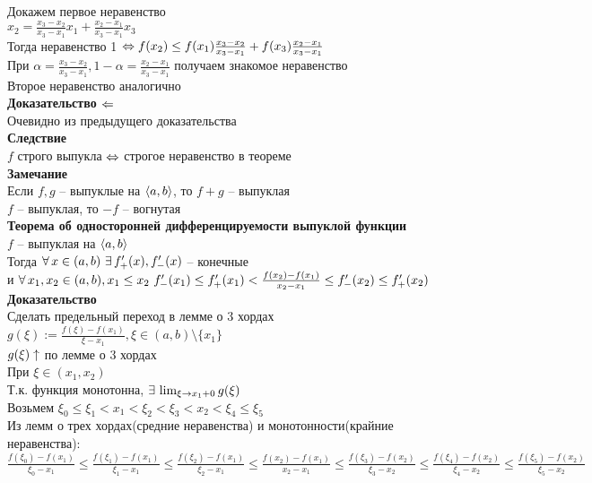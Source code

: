 \documentclass[12pt]{article}
\begin{document}
Докажем первое неравенство\\
$x_2 = \frac{x_3-x_2}{x_3-x_1}x_1 + \frac{x_2-x_1}{x_3-x_1}x_3$\\
Тогда неравенство 1 $\Leftrightarrow f(x_2) \leq f(x_1) \frac{x_3-x_2}{x_3-x_1} + f(x_3)\frac{x_2-x_1}{x_3-x_1}$\\
При $\alpha = \frac{x_3-x_2}{x_3-x_1}, 1 - \alpha = \frac{x_2-x_1}{x_3-x_1}$ получаем знакомое неравенство\\
Второе неравенство аналогично\\
\textbf{Доказательство $\Leftarrow$}\\
Очевидно из предыдущего доказательства\\
\textbf{Следствие}\\
$f$ строго выпукла $\Leftrightarrow$ строгое неравенство в теореме\\
\textbf{Замечание}\\
Если $f,g$ -- выпуклые на $\langle a, b \rangle$, то $f+g$ -- выпуклая\\
$f$ -- выпуклая, то $-f$ -- вогнутая\\
\textbf{Теорема об односторонней дифференцируемости выпуклой функции}\\
$f$ -- выпуклая на $\langle a, b \rangle$\\
Тогда $\forall\, x \in (a,b)\ \exists\, f_+'(x), f_-'(x)$ -- конечные\\
и $\fall x_1, x_2 \in (a,b), x_1 \leq x_2\ f_-'(x_1) \leq f_+'(x_1) < \frac{f(x_2)-f(x_1)}{x_2-x_1} \leq f_-'(x_2) \leq f_+'(x_2)$\\
\textbf{Доказательство}\\
Сделать предельный переход в лемме о 3 хордах\\
$g(\xi) := \frac{f(\xi)-f(x_1)}{\xi - x_1}, \xi \in (a,b) \setminus \{x_1\}$\\
$g(\xi) \uparrow$ по лемме о 3 хордах\\
При $\xi \in (x_1, x_2)$\\
Т.к. функция монотонна, $\exists\, \lim_{\xi \rightarrow x_1 + 0} g(\xi)$\\
Возьмем $\xi_0 \leq \xi_1 < x_1 < \xi_2 < \xi_3 < x_2 < \xi_4 \leq \xi_5$\\
Из лемм о трех хордах(средние неравенства) и монотонности(крайние неравенства):\\
$\frac{f(\xi_0)-f(x_1)}{\xi_0 - x_1} \leq \frac{f(\xi_1)-f(x_1)}{\xi_1 - x_1} \leq \frac{f(\xi_2)-f(x_1)}{\xi_2 - x_1} \leq \frac{f(x_2) -f(x_1)}{x_2-x_1} \leq \frac{f(\xi_3)-f(x_2)}{\xi_3 - x_2} \leq \frac{f(\xi_4)-f(x_2)}{\xi_4-x_2} \leq \frac{f(\xi_5)-f(x_2)}{\xi_5-x_2}$\\
\end{document}
